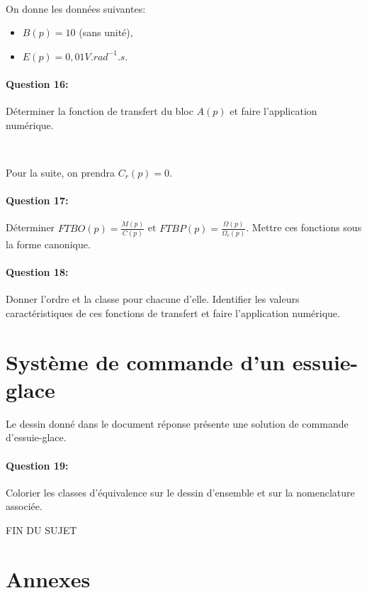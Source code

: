 ~\

On donne les données suivantes:
\begin{itemize}
 \item $B(p)=10$ (sans unité),
 \item $E(p)=0,01V.rad^{-1}.s$.
\end{itemize}

\paragraph{Question 16:} Déterminer la fonction de transfert du bloc $A(p)$ et faire l'application numérique.

~\

\newpage

Pour la suite, on prendra $C_r(p)=0$.

\paragraph{Question 17:} Déterminer $FTBO(p)=\frac{M(p)}{C(p)}$ et $FTBP(p)=\frac{\Omega(p)}{\Omega_c(p)}$. Mettre ces fonctions sous la forme canonique.

\paragraph{Question 18:} Donner l'ordre et la classe pour chacune d'elle. Identifier les valeurs caractéristiques de ces fonctions de transfert et faire l'application numérique.

\section{Système de commande d'un essuie-glace}

Le dessin donné dans le document réponse présente une solution de commande d'essuie-glace.

\paragraph{Question 19:} Colorier les classes d'équivalence sur le dessin d'ensemble et sur la nomenclature associée.

\begin{center}
FIN DU SUJET
\end{center}

\newpage

\section{Annexes}

